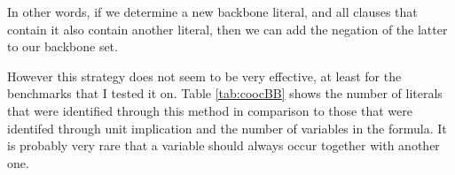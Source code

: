 In other words, if we determine a new backbone literal, and all clauses that contain it also contain another literal, then we can add the negation of the latter to our backbone set. 

However this strategy does not seem to be very effective, at least for the benchmarks that I tested it on. Table \ref{tab:coocBB} shows the number of literals that were identified through this method in comparison to those that were identifed through unit implication and the number of variables in the formula. It is probably very rare that a variable should always occur together with another one.




